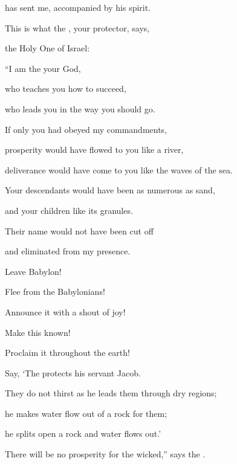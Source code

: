 {{}
has sent
me, accompanied by his spirit.
\par }{\Q {}This is what
the {}, your protector,
says,
\par }{\Q the Holy One
of Israel:

\par }{\Q “I am
the {}
your God,
\par }{\Q who teaches
you how
to succeed,
\par }{\Q who
leads
you in the way
you should go.
\par }{\Q {}If only
you had obeyed my
commandments,
\par }{\Q prosperity
would have flowed to you like a river,
\par }{\Q deliverance
would have come to you like the waves
of the sea.
\par }{\Q {}Your descendants
would have been
as numerous as sand,
\par }{\Q and your children
like its granules.
\par }{\Q Their name
would not
have been cut off
\par }{\Q and eliminated
from my presence.
\par }{\Q {}Leave
Babylon!
\par }{\Q Flee
from the Babylonians!
\par }{\Q Announce it with a shout
of joy!
\par }{\Q Make this
known!
\par }{\Q Proclaim
it throughout the earth!

\par }{\Q Say,
‘The
{}
protects
his servant
Jacob.
\par }{\Q {}They do not
thirst
as he leads them through
dry regions;
\par }{\Q he makes water
flow
out of a rock
for them;
\par }{\Q he splits
open a rock
and water
flows out.’
\par }{\Q {}There will be no
prosperity
for the wicked,”
says
the {}.

\par }
